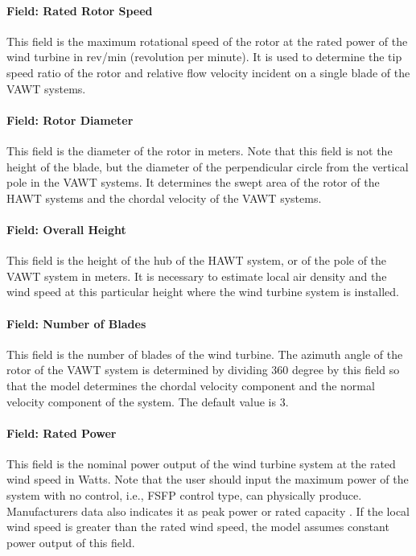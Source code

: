 \paragraph{Field: Rated Rotor Speed}\label{field-rated-rotor-speed}

This field is the maximum rotational speed of the rotor at the rated power of the wind turbine in rev/min (revolution per minute). It is used to determine the tip speed ratio of the rotor and relative flow velocity incident on a single blade of the VAWT systems.

\paragraph{Field: Rotor Diameter}\label{field-rotor-diameter}

This field is the diameter of the rotor in meters. Note that this field is not the height of the blade, but the diameter of the perpendicular circle from the vertical pole in the VAWT systems. It determines the swept area of the rotor of the HAWT systems and the chordal velocity of the VAWT systems.

\paragraph{Field: Overall Height}\label{field-overall-height}

This field is the height of the hub of the HAWT system, or of the pole of the VAWT system in meters. It is necessary to estimate local air density and the wind speed at this particular height where the wind turbine system is installed.

\paragraph{Field: Number of Blades}\label{field-number-of-blades}

This field is the number of blades of the wind turbine. The azimuth angle of the rotor of the VAWT system is determined by dividing 360 degree by this field so that the model determines the chordal velocity component and the normal velocity component of the system. The default value is 3.

\paragraph{Field: Rated Power}\label{field-rated-power}

This field is the nominal power output of the wind turbine system at the rated wind speed in Watts. Note that the user should input the maximum power of the system with no control, i.e., FSFP control type, can physically produce. Manufacturers data also indicates it as peak power or rated capacity . If the local wind speed is greater than the rated wind speed, the model assumes constant power output of this field.

